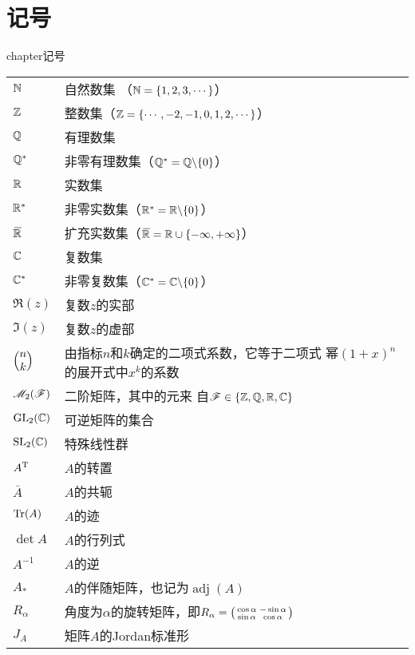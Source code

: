 \chapter*{记号}
 {chapter}{记号}
\vspace*{5cm}
\begin{longtable}{p{}p{}}
 $\mathbb N$         & 自然数集 （$\mathbb N=\{1,2,3,\cdots\}$）\\
 $\mathbb Z$         & 整数集（$\mathbb Z=\{\cdots,-2,-1,0,1,2,\cdots\}$）\\
 $\mathbb Q$         & 有理数集\\
 $\mathbb Q^\ast$    & 非零有理数集（$\mathbb Q^\ast=\mathbb Q\backslash\{0\}$）\\
 $\mathbb R$         & 实数集\\
 $\mathbb R^\ast$    & 非零实数集（$\mathbb R^\ast=\mathbb R\backslash\{0\}$）\\
 ${}\mkern2mu\overline{\mkern-2mu\mathbb R}$   & 扩充实数集（${}\mkern2mu\overline{\mkern-2mu\mathbb R}=\mathbb R\cup\{-\infty,+\infty\}$）\\
 $\mathbb C$         & 复数集 \\
 $\mathbb C^\ast$    & 非零复数集（$\mathbb C^\ast=\mathbb C\backslash\{0\}$） \\
 $\Re(z)$      & 复数$z$的实部 \\
 $\Im(z)$      & 复数$z$的虚部 \\
 $\Binom nk$   & 由指标$n$和$k$确定的二项式系数，它等于二项式
                幂$(1+x)^n$的展开式中$x^k$的系数\\
 $\mathscr M_2(\mathscr F)$ & 二阶矩阵，其中的元来
                 自$\mathscr F\in\{\mathbb Z,\mathbb Q,\mathbb R,\mathbb C\}$ \\
 $\operatorname{GL}_2(\mathbb C)$  & 可逆矩阵的集合 \\
 $\operatorname{SL}_2(\mathbb C)$  & 特殊线性群\\
 $A^{\mathrm T}$       & $A$的转置\\
 $\bar A$      & $A$的共轭\\
 $\operatorname{Tr}(A)$      & $A$的迹\\
 $\det A$      & $A$的行列式\\
 $A^{-1}$      & $A$的逆\\
 $A_\ast$      & $A$的伴随矩阵，也记为$\operatorname{adj}(A)$\\
 $R_\alpha$    & 角度为$\alpha$的旋转矩阵，即$R_\alpha=\begin{psmallmatrix}
   \cos\alpha & -\sin\alpha\\
   \sin\alpha & \cos\alpha
 \end{psmallmatrix}$ \\
 $J_A$         & 矩阵$A$的Jordan标准形\\

\end{longtable}
